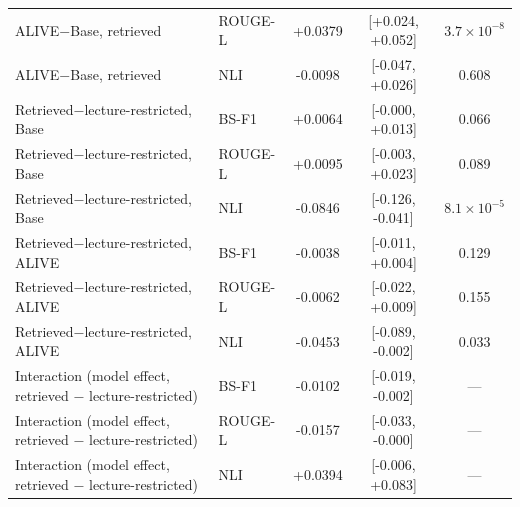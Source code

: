 \begin{table}[!htbp]
\begin{tabular}{llccc}
ALIVE$-$Base, retrieved & ROUGE-L & +0.0379 & [+0.024, +0.052] & $3.7{\times}10^{-8}$ \\
ALIVE$-$Base, retrieved & NLI & -0.0098 & [-0.047, +0.026] & 0.608 \\
Retrieved$-$lecture-restricted, Base & BS-F1 & +0.0064 & [-0.000, +0.013] & 0.066 \\
Retrieved$-$lecture-restricted, Base & ROUGE-L & +0.0095 & [-0.003, +0.023] & 0.089 \\
Retrieved$-$lecture-restricted, Base & NLI & -0.0846 & [-0.126, -0.041] & $8.1{\times}10^{-5}$ \\
Retrieved$-$lecture-restricted, ALIVE & BS-F1 & -0.0038 & [-0.011, +0.004] & 0.129 \\
Retrieved$-$lecture-restricted, ALIVE & ROUGE-L & -0.0062 & [-0.022, +0.009] & 0.155 \\
Retrieved$-$lecture-restricted, ALIVE & NLI & -0.0453 & [-0.089, -0.002] & 0.033 \\
Interaction (model effect, retrieved $-$ lecture-restricted) & BS-F1 & -0.0102 & [-0.019, -0.002] & --- \\
Interaction (model effect, retrieved $-$ lecture-restricted) & ROUGE-L & -0.0157 & [-0.033, -0.000] & --- \\
Interaction (model effect, retrieved $-$ lecture-restricted) & NLI & +0.0394 & [-0.006, +0.083] & --- \\
\bottomrule
\end{tabular}
\end{table}
